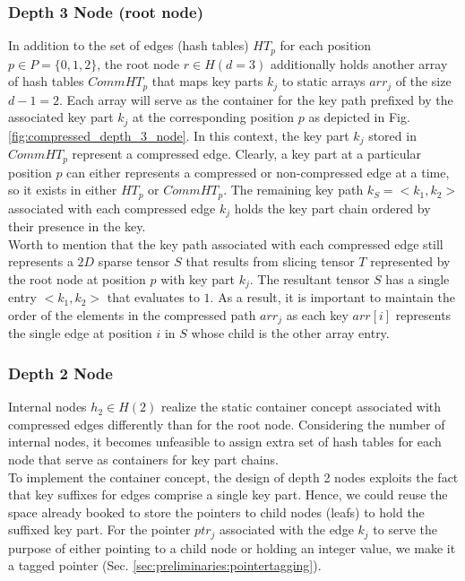 \subsubsection{Depth 3 Node (root node)} 
In addition to the set of edges (hash tables) $HT_{p}$ for each position $p \in P = \{0, 1, 2\}$, the root node $r \in H(d = 3)$ additionally holds another array of hash tables $CommHT_{p}$ that maps key parts $k_{j}$ to static arrays $arr_{j}$ of the size $d -1 = 2$. 
Each array will serve as the container for the key path prefixed by the associated key part $k_{j}$ at the corresponding position $p$ as depicted in Fig. \ref{fig:compressed_depth_3_node}. 
In this context, the key part $k_{j}$ stored in $CommHT_{p}$ represent a compressed edge. Clearly, a key part at a particular position $p$ can either represents a compressed or non-compressed edge at a time, so it exists in either $HT_{p}$ or $CommHT_{p}$. 
The remaining key path $k_{S} = <k_{1}, k_{2}>$ associated with each compressed edge $k_{j}$ holds the key part chain ordered by their presence in the key. \\

Worth to mention that the key path associated with each compressed edge still represents a $2D$ sparse tensor $S$ that results from slicing tensor $T$ represented by the root node at position $p$ with key part $k_{j}$. The resultant tensor $S$ has a single entry $<k_{1}, k_{2}>$ that evaluates to $1$. 
As a result, it is important to maintain the order of the elements in the compressed path $arr_{j}$ as each key $arr[i]$ represents the single edge at position $i$ in $S$ whose child is the other array entry. \\

\subsubsection{Depth 2 Node} Internal nodes $h_2 \in H(2)$ realize the static container concept associated with compressed edges differently than for the root node. 
Considering the number of internal nodes, it becomes unfeasible to assign extra set of hash tables for each node that serve as containers for key part chains. \\

To implement the container concept, the design of depth 2 nodes exploits the fact that key suffixes for edges comprise a single key part.
Hence, we could reuse the space already booked to store the pointers to child nodes (leafs) to hold the suffixed key part.
For the pointer $ptr_{j}$ associated with the edge $k_{j}$ to serve the purpose of either pointing to a child node or holding an integer value, we make it a tagged pointer (Sec. \ref{sec:preliminaries:pointertagging}). \\

